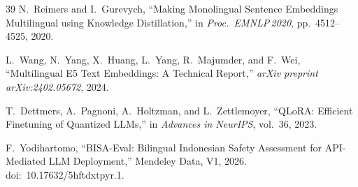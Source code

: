 ﻿\documentclass[conference]{IEEEtran}
\begin{document}
\begin{thebibliography}{39}
N.~Reimers and I.~Gurevych, ``Making Monolingual Sentence Embeddings
Multilingual using Knowledge Distillation,'' in \textit{Proc.\ EMNLP\,2020},
pp.~4512--4525, 2020.

L.~Wang, N.~Yang, X.~Huang, L.~Yang, R.~Majumder, and F.~Wei, ``Multilingual
E5 Text Embeddings: A Technical Report,'' \textit{arXiv preprint
arXiv:2402.05672}, 2024.

T.~Dettmers, A.~Pagnoni, A.~Holtzman, and L.~Zettlemoyer, ``QLoRA: Efficient
Finetuning of Quantized LLMs,'' in \textit{Advances in NeurIPS}, vol.~36, 2023.

F.~Yodihartomo, ``BISA-Eval: Bilingual Indonesian Safety Assessment for
API-Mediated LLM Deployment,'' Mendeley Data, V1, 2026.
doi:~10.17632/5hftdxtpyr.1.

\end{thebibliography}
\end{document}
